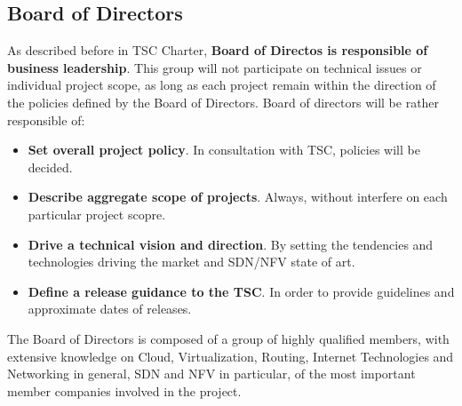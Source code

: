 \documentclass[a4paper, 12pt]{book}
\begin{document}
\subsection{Board of Directors}
As described before in TSC Charter, \textbf{Board of Directos is responsible of business leadership}. This group will not participate on technical issues or individual project scope, as long as each project remain within the direction of the policies defined by the Board of Directors. Board of directors will be rather responsible of:
\begin{itemize}\itemsep0pt
\item{\textbf{Set overall project policy}}. In consultation with TSC, policies will be decided.
\item{\textbf{Describe aggregate scope of projects}}. Always, without interfere on each particular project scopre.
\item{\textbf{Drive a technical vision and direction}}. By setting the tendencies and technologies driving the market and SDN/NFV state of art.
\item{\textbf{Define a release guidance to the TSC}}. In order to provide guidelines and approximate dates of releases.
\end{itemize}
The Board of Directors is composed of a group of highly qualified members, with extensive knowledge on Cloud, Virtualization, Routing, Internet Technologies and Networking in general, SDN and NFV in particular, of the most important member companies involved in the project.
\end{document}
